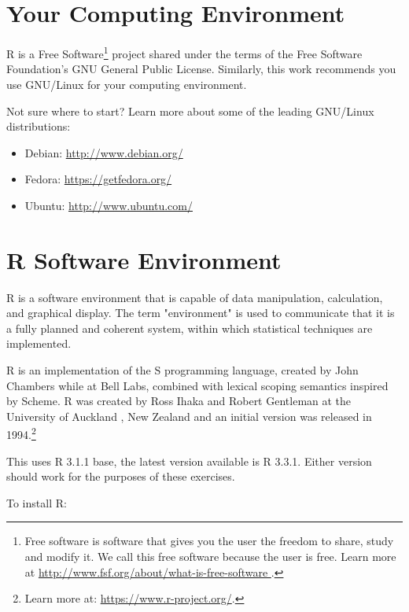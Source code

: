 %
%
%
%
%

\section{Your Computing Environment}
R is a Free Software\footnote{Free software is software that gives you the user
 the freedom to share, study and modify it. We call this free software because 
the user is free. Learn more at \url{http://www.fsf.org/about/what-is-free-software
}.} project shared under the terms of the Free Software Foundation's GNU 
General Public License. Similarly, this work recommends you use GNU/Linux for 
your computing environment.

Not sure where to start? Learn more about some of the leading GNU/Linux 
distributions:

\begin{itemize}
 \item Debian: \url{http://www.debian.org/}
 \item Fedora: \url{https://getfedora.org/}
 \item Ubuntu: \url{http://www.ubuntu.com/}
\end{itemize}

\section{R Software Environment}
R is a software environment that is capable of data manipulation, calculation, 
and graphical display. The term "environment" is used to communicate that it is
 a fully planned and coherent system, within which statistical techniques are 
implemented.

R is an implementation of the S programming language, created by John Chambers 
while at Bell Labs, combined with lexical scoping semantics inspired by Scheme.
 R was created by Ross Ihaka and Robert Gentleman at the University of Auckland
, New Zealand and an initial version was released in 1994.\footnote{Learn more 
at: \url{https://www.r-project.org/}.}

This uses R 3.1.1 base, the latest version available is R 3.3.1. Either version
 should work for the purposes of these exercises.

To install R:

